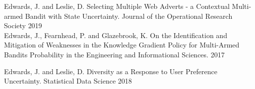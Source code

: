 \begin{cvhonors}

    \cvhonor
    {Edwards, J. and Leslie, D.}
    {Selecting Multiple Web Adverts - a Contextual Multi-armed Bandit
with State Uncertainty.}
    {Journal of the Operational Research Society}
    {2019}
\\
     \cvhonor
    {Edwards, J., Fearnhead, P. and Glazebrook, K.}
    {On the Identification and Mitigation of Weaknesses in the Knowledge Gradient Policy for Multi-Armed Bandits}
    {Probability in the Engineering and Informational Sciences.}
    {2017}
\end{cvhonors}
\begin{cvhonors}
     \cvhonor
    {Edwards, J. and Leslie, D.}
    {Diversity as a Response to User Preference Uncertainty.}
    {Statistical Data Science}
    {2018}
\end{cvhonors}
